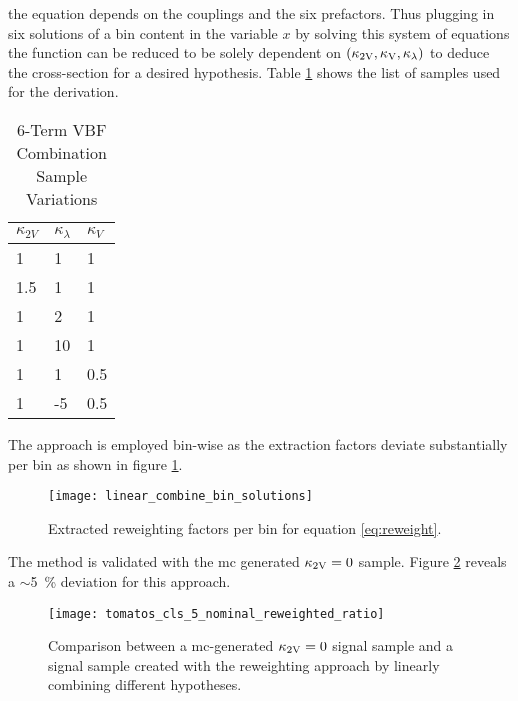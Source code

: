 the equation depends on the couplings and the six prefactors. Thus plugging in six solutions of a bin content in the variable $x$ by solving this system of equations the function can be reduced to be solely dependent on $(\kappa_\text{2V}, \kappa_\text{V}, \kappa_\lambda )$ to deduce the cross-section for a desired hypothesis. Table \ref*{tab:vbf_hh_6term_varlist} shows the list of samples used for the derivation.
\begin{table}
    \centering
    \caption{6-Term VBF Combination Sample Variations}
    \label{tab:vbf_hh_6term_varlist}
    \begin{tabular}{ |l|l|l| }
        \hline
        \textbf {$\kappa_{2V}$} & \textbf {$\kappa_\lambda$} & \textbf {$\kappa_V$} \\
        \hline
        1                       & 1                          & 1                    \\
        1.5                     & 1                          & 1                    \\
        1                       & 2                          & 1                    \\
        1                       & 10                         & 1                    \\
        1                       & 1                          & 0.5                  \\
        1                       & -5                         & 0.5                  \\
        \hline
    \end{tabular}
\end{table}
The approach is employed bin-wise as the extraction factors deviate substantially per bin as shown in figure \ref{fig:linear_combine_bin_solutions}.
\begin{figure}
    \centering
    \texttt{[image: linear\_combine\_bin\_solutions]}
    \caption[]{Extracted reweighting factors per bin for equation \ref{eq:reweight}.}
    \label{fig:linear_combine_bin_solutions}
\end{figure}
The method is validated with the mc generated $\kappa_{\text{2V}}=0$ sample. Figure \ref{fig:tomatos_cls_5_nominal_reweighted_ratio} reveals a $\sim$\qty[]{5}{\percent} deviation for this approach. 
\begin{figure}
    \centering
    \texttt{[image: tomatos\_cls\_5\_nominal\_reweighted\_ratio]}
    \caption[]{Comparison between a \ac{mc}-generated $\kappa_{\text{2V}}=0$ signal sample and a signal sample created with the reweighting approach by linearly combining different \ktwov hypotheses. }
    \label{fig:tomatos_cls_5_nominal_reweighted_ratio}
\end{figure}
 

